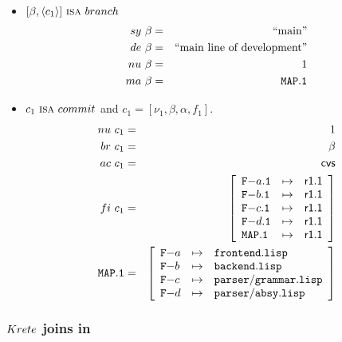 \documentclass[fleqn, 10pt, a4paper]{report}
\begin{document}
\begin{itemize}
\item $[\beta, \langle c_1\rangle]\ \mbox{\textsc{isa}}\ \mathnormal{branch}$
\begin{eqnarray*}
\mathnormal{sy}\ \beta &=& \mbox{``main''} \\
\mathnormal{de}\ \beta &=& \mbox{``main line of development''} \\
\mathnormal{nu}\ \beta &=& 1 \\
\mathnormal{ma}\ \beta &=& \mathtt{MAP.1}
\end{eqnarray*}

\item $c_1\ \mbox{\textsc{isa}}\ \mathnormal{commit}$ and
$c_1=[\nu_1, \beta, \alpha, f_1]$.
\begin{eqnarray*}
\mathnormal{nu}\ c_1 &=& 1 \\
\mathnormal{br}\ c_1 &=& \beta \\
\mathnormal{ac}\ c_1 &=& \mathsf{cvs} \\
\mathnormal{fi}\ c_1 &=& \left[
\begin{array}{lcl}
\mathtt{F-}a\mathtt{.1} & \mapsto & \mathsf{r1.1} \\
\mathtt{F-}b\mathtt{.1} & \mapsto & \mathsf{r1.1} \\
\mathtt{F-}c\mathtt{.1} & \mapsto & \mathsf{r1.1} \\
\mathtt{F-}d\mathtt{.1} & \mapsto & \mathsf{r1.1} \\
\mathtt{MAP.1}         & \mapsto & \mathsf{r1.1} \\
\end{array}\right] \\
\mathtt{MAP.1} &=& \left[
\begin{array}{lcl}
\mathtt{F-}a &\mapsto& \mathtt{frontend.lisp} \\
\mathtt{F-}b &\mapsto& \mathtt{backend.lisp} \\
\mathtt{F-}c &\mapsto& \mathtt{parser/grammar.lisp} \\
\mathtt{F-}d &\mapsto& \mathtt{parser/absy.lisp} \\
\end{array}\right]
\end{eqnarray*}
\end{itemize}

\subsubsection{$\mathnormal{Krete}$ joins in}
\end{document}
